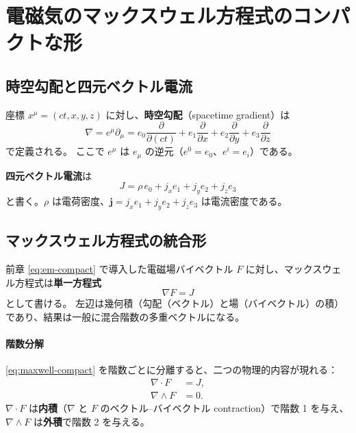 \documentclass[dvipdfmx,a4paper,oneside]{jsbook}
\numberwithin{equation}{chapter}
\begin{document}
\section{電磁気のマックスウェル方程式のコンパクトな形}

\subsection{時空勾配と四元ベクトル電流}

座標 \(x^\mu = (ct, x, y, z)\) に対し、\textbf{時空勾配}（spacetime gradient）は
\begin{equation}
  \nabla = e^\mu \partial_\mu
  = e_0 \frac{\partial}{\partial(ct)} + e_1 \frac{\partial}{\partial x} + e_2 \frac{\partial}{\partial y} + e_3 \frac{\partial}{\partial z}
  \label{eq:spacetime-gradient}
\end{equation}
で定義される。
ここで \(e^\mu\) は \(e_\mu\) の逆元（\(e^0 = e_0\)、\(e^i = e_i\)）である。

\textbf{四元ベクトル電流}は
\begin{equation}
  J = \rho\, e_0 + j_x e_1 + j_y e_2 + j_z e_3
  \label{eq:four-current}
\end{equation}
と書く。\(\rho\) は電荷密度、\(\mathbf{j} = j_x e_1 + j_y e_2 + j_z e_3\) は電流密度である。

\subsection{マックスウェル方程式の統合形}

前章 \eqref{eq:em-compact} で導入した電磁場バイベクトル \(F\) に対し、マックスウェル方程式は\textbf{単一方程式}
\begin{equation}
  \nabla F = J
  \label{eq:maxwell-compact}
\end{equation}
として書ける。
左辺は幾何積（勾配（ベクトル）と場（バイベクトル）の積）であり、結果は一般に混合階数の多重ベクトルになる。

\paragraph{階数分解}
\eqref{eq:maxwell-compact} を階数ごとに分離すると、二つの物理的内容が現れる：
\begin{align}
  \nabla\cdot F &= J, \label{eq:maxwell-vector} \\
  \nabla\wedge F &= 0. \label{eq:maxwell-bivector}
\end{align}
\(\nabla\cdot F\) は\textbf{内積}（\(\nabla\) と \(F\) のベクトル–バイベクトル contraction）で階数 1 を与え、\(\nabla\wedge F\) は\textbf{外積}で階数 2 を与える。
\end{document}
